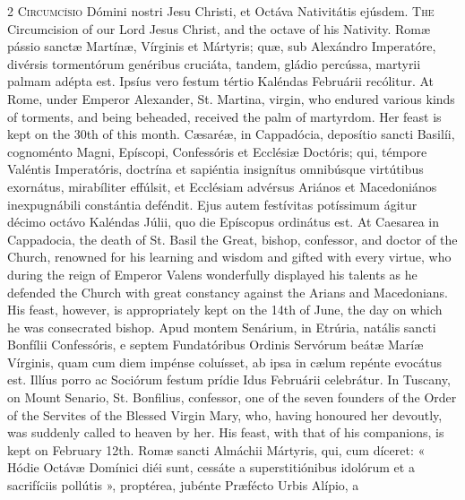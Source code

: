 \begin{paracol}{2}
\lettrine[lines=2]{C}{ircumcísio} Dómini nostri Jesu Christi, et Octáva Nativitátis ejúsdem.
\switchcolumn
{}
\lettrine[lines=2]{T}{he} Circumcision of our Lord Jesus Christ, and the octave of his Nativity.
\switchcolumn*
{}
Romæ pássio sanctæ Martínæ, Vírginis et 
 Mártyris; quæ, sub Alexándro Imperatóre, divérsis tormentórum genéribus 
 cruciáta, tandem, gládio percússa, martyrii palmam adépta est. Ipsíus 
 vero festum tértio Kaléndas Februárii recólitur.
\switchcolumn
{}
At Rome, under Emperor Alexander, St. Martina, virgin, who endured various 
 kinds of torments, and being beheaded, received the palm of martyrdom. 
 Her feast is kept on the 30th of this month.
\switchcolumn*
{}
Cæsaréæ, in Cappadócia, deposítio sancti Basilíi, cognoménto Magni, Epíscopi, Confessóris et Ecclésiæ Doctóris; qui, témpore Valéntis Imperatóris, doctrína et sapiéntia insignítus omnibúsque virtútibus exornátus, mirabíliter effúlsit, et Ecclésiam advérsus Ariános et Macedoniános inexpugnábili constántia deféndit. Ejus autem festívitas potíssimum ágitur décimo octávo Kaléndas Júlii, quo die Epíscopus ordinátus est.
\switchcolumn
{}
At Caesarea in Cappadocia, the death of St. Basil the Great, bishop, 
 confessor, and doctor of the Church, renowned for his learning and wisdom 
 and gifted with every virtue, who during the reign of Emperor Valens 
 wonderfully displayed his talents as he defended the Church with great 
 constancy against the Arians and Macedonians. His feast, however, is 
 appropriately kept on the 14th of June, the day on which he was consecrated 
 bishop.
\switchcolumn*
{}
Apud montem Senárium, in Etrúria, natális sancti Bonfílii Confessóris, e 
 septem Fundatóribus Ordinis Servórum beátæ 
 Maríæ Vírginis, quam cum diem impénse coluísset, ab ipsa in cælum repénte 
 evocátus est. Illíus porro ac Sociórum festum prídie Idus Februárii 
 celebrátur.
\switchcolumn
{}
In Tuscany, on Mount Senario, St. Bonfilius, confessor, one of the seven 
 founders of the Order of the Servites of the Blessed Virgin Mary, who, 
 having honoured her devoutly, was suddenly called to heaven by her. 
 His feast, with that of his companions, is kept on February 12th.
\switchcolumn*
{}
Romæ sancti Almáchii Mártyris, qui, cum díceret: 
 « Hódie Octávæ Domínici diéi sunt, cessáte a superstitiónibus idolórum et a 
 sacrifíciis pollútis », proptérea, jubénte Præfécto Urbis Alípio, a 

\end{paracol}
